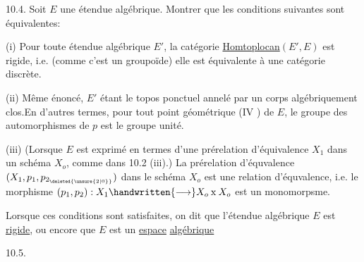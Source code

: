 10.4.  Soit $E$ une étendue algébrique. Montrer que les conditions suivantes sont équivalentes:
\margin{\handwritten{$\times$}}

(i) Pour toute étendue algébrique $E'$, la catégorie  \uline{Homtoplocan}$(E',E)$ est rigide, i.e.  (comme c'est un groupoïde) elle est équivalente à une catégorie discrète.

(ii) Même énoncé, $E'$ étant le topos ponctuel annelé par un corps algébriquement clos.En d'autres termes, pour tout point géométrique (IV ) de $E$, le groupe des automorphismes de $p$ est le groupe unité.
\margin{\handwritten{$\times$}}

(iii) (Lorsque $E$ est exprimé en termes d'une prérelation d'équivalence  $X_1$ dans un schéma $X_o$, comme dans 10.2 (iii).) La prérelation d'équvalence $(X_1,p_1,p_{2_{\deleted{\unsure{2|0}}}})$ dans le schéma $X_o$ est une relation d'équvalence, i.e. le morphisme $(p_1,p_2):X_1\handwritten{\longrightarrow}X_o\mathbin{\mathrm{x}}X_o$ est un monomorpsme.

Lorsque ces conditions sont satisfaites, on dit que l'étendue algébrique $E$ est \uline{rigide}, ou encore que $E$ est un \uline{espace} \uline{algébrique} \handwritten{(*)}

10.5.


